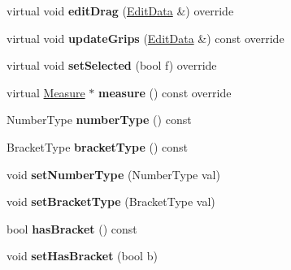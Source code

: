 \begin{DoxyCompactItemize}
\mbox{\label{class_ms_1_1_tuplet_a722934e7854f58e285920b04e10acb40}} 
virtual void {\bfseries edit\+Drag} (\hyperlink{class_ms_1_1_edit_data}{Edit\+Data} \&) override
\item 
\mbox{\label{class_ms_1_1_tuplet_aca86d1b117c148fb0ab452aedc13e4eb}} 
virtual void {\bfseries update\+Grips} (\hyperlink{class_ms_1_1_edit_data}{Edit\+Data} \&) const override
\item 
\mbox{\label{class_ms_1_1_tuplet_af89a01a300474e53c441a9a23afb162d}} 
virtual void {\bfseries set\+Selected} (bool f) override
\item 
\mbox{\label{class_ms_1_1_tuplet_a6af8803f95c243c0310a858e52c80b72}} 
virtual \hyperlink{class_ms_1_1_measure}{Measure} $\ast$ {\bfseries measure} () const override
\item 
\mbox{\label{class_ms_1_1_tuplet_aa6e0a66163433aba2c77fd94d7131530}} 
Number\+Type {\bfseries number\+Type} () const
\item 
\mbox{\label{class_ms_1_1_tuplet_afb467f983b159b534843a11cfa0cdd9e}} 
Bracket\+Type {\bfseries bracket\+Type} () const
\item 
\mbox{\label{class_ms_1_1_tuplet_a8f7103b2b4f83ce09ccbc638fb757845}} 
void {\bfseries set\+Number\+Type} (Number\+Type val)
\item 
\mbox{\label{class_ms_1_1_tuplet_a796a30270e6785828087500a4d5a8db0}} 
void {\bfseries set\+Bracket\+Type} (Bracket\+Type val)
\item 
\mbox{\label{class_ms_1_1_tuplet_a027b9de991fe9a135f801449ef919c0e}} 
bool {\bfseries has\+Bracket} () const
\item 
\mbox{\label{class_ms_1_1_tuplet_afbb17d0e1d150c5d386fbc8a20c8c2c4}} 
void {\bfseries set\+Has\+Bracket} (bool b)
\item 
\mbox{\label{class_ms_1_1_tuplet_ab52fd5b0a38b7f116147e8c2bd2fa8cb}} 

\end{DoxyCompactItemize}
